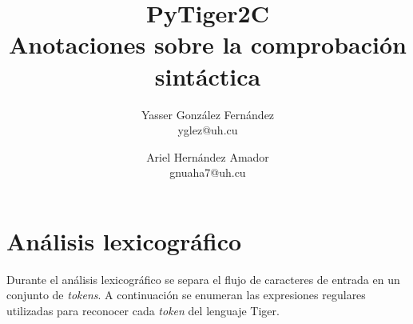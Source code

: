 \documentclass{article}
\title{
	\LARGE{PyTiger2C} \\
	\Large{Anotaciones sobre la comprobación sintáctica}
}
\author{
  	Yasser González Fernández \\
  	\small{yglez@uh.cu}
  	\and
  	Ariel Hernández Amador \\
  	\small{gnuaha7@uh.cu}
}
\date{}
\begin{document}
\maketitle

\thispagestyle{empty}

\newpage

\setcounter{page}{1}

\section{Análisis lexicográfico}

Durante el análisis lexicográfico se separa el flujo de caracteres de entrada
en un conjunto de \emph{tokens}. A continuación se enumeran las expresiones
regulares utilizadas para reconocer cada \emph{token} del lenguaje Tiger.
\end{document}
